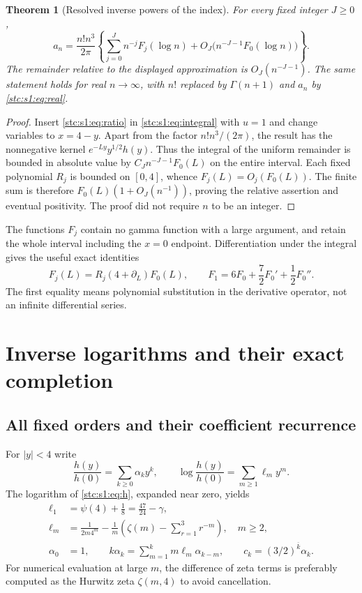 \documentclass[11pt,letterpaper]{article}
\numberwithin{equation}{section}
\newtheorem{theorem}{Theorem}[section]
\theoremstyle{remark}\newtheorem{remark}[theorem]{Remark}
\newcommand{\rf}[2]{#1^{\overline{#2}}}
\newcommand{\Ga}{\Gamma}
\begin{document}
\begin{theorem}[Resolved inverse powers of the index]\label{stc:s1:th:resummed}
For every fixed integer $J\geq0$,
\begin{equation}\label{stc:s1:eq:resummed}
 a_n=\frac{n!n^3}{2\pi}
 \left\{\sum_{j=0}^J n^{-j}F_j(\log n)
       +O_J\bigl(n^{-J-1}F_0(\log n)\bigr)\right\}.
\end{equation}
The remainder relative to the displayed approximation is $O_J(n^{-J-1})$. The same statement holds for real $n\to\infty$, with $n!$ replaced by $\Ga(n+1)$ and $a_n$ by \eqref{stc:s1:eq:real}.
\end{theorem}
\begin{proof}
Insert \eqref{stc:s1:eq:ratio} in \eqref{stc:s1:eq:integral} with $u=1$ and change variables to $x=4-y$. Apart from the factor $n!n^3/(2\pi)$, the result has the nonnegative kernel $e^{-Ly}y^{1/2}h(y)$. Thus the integral of the uniform remainder is bounded in absolute value by $C_J n^{-J-1}F_0(L)$ on the entire interval. Each fixed polynomial $R_j$ is bounded on $[0,4]$, whence $F_j(L)=O_j(F_0(L))$. The finite sum is therefore $F_0(L)(1+O_J(n^{-1}))$, proving the relative assertion and eventual positivity. The proof did not require $n$ to be an integer.
\end{proof}
The functions $F_j$ contain no gamma function with a large argument, and retain the whole interval including the $x=0$ endpoint. Differentiation under the integral gives the useful exact identities
\begin{equation}\label{stc:s1:eq:differential}
 F_j(L)=R_j(4+\partial_L)F_0(L),\qquad
 F_1=6F_0+\frac72F_0'+\frac12F_0''.
\end{equation}
The first equality means polynomial substitution in the derivative operator, not an infinite differential series.

\section{Inverse logarithms and their exact completion}\label{stc:s1:sec:logs}
\subsection{All fixed orders and their coefficient recurrence}
For $|y|<4$ write
\begin{equation}\label{stc:s1:eq:alpha}
 \frac{h(y)}{h(0)}=\sum_{k\geq0}\alpha_k y^k,
 \qquad \log\frac{h(y)}{h(0)}=\sum_{m\geq1}\ell_m y^m.
\end{equation}
The logarithm of \eqref{stc:s1:eq:h}, expanded near zero, yields
\begin{align}
 \ell_1&=\psi(4)+\frac18=\frac{47}{24}-\gamma,\label{stc:s1:eq:ell1}\\
 \ell_m&=\frac1{2m4^m}-\frac1m\left(\zeta(m)-\sum_{r=1}^3r^{-m}\right),\quad m\geq2,\label{stc:s1:eq:ell}\\
 \alpha_0&=1,\qquad k\alpha_k=\sum_{m=1}^k m\ell_m\alpha_{k-m},\qquad
 c_k=\rf{(3/2)}{k}\alpha_k.\label{stc:s1:eq:crec}
\end{align}
For numerical evaluation at large $m$, the difference of zeta terms is preferably computed as the Hurwitz zeta $\zeta(m,4)$ to avoid cancellation.
\end{document}
